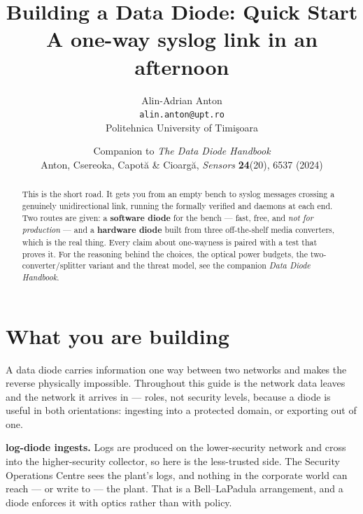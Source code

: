 \documentclass[11pt,a4paper]{article}
\title{\vspace{-12mm}\textbf{Building a Data Diode: Quick Start}\\[2mm]
       \large A one-way syslog link in an afternoon}
\author{Alin-Adrian Anton \\
        \small \texttt{alin.anton@upt.ro} \\
        \small Politehnica University of Timi\c{s}oara}
\date{\small Companion to \emph{The Data Diode Handbook}\\
      \small Anton, Csereoka, Capot\u{a} \& Cioarg\u{a},
      \emph{Sensors} \textbf{24}(20), 6537 (2024)}
\renewcommand{\amp}{\prog{ld\_amp}}
\renewcommand{\deamp}{\prog{ld\_deamp}}
\begin{document}
\maketitle
\thispagestyle{fancy}

\begin{abstract}
\noindent
This is the short road. It gets you from an empty bench to syslog messages
crossing a genuinely unidirectional link, running the formally verified
\amp{} and \deamp{} daemons at each end. Two routes are given: a
\textbf{software diode} for the bench --- fast, free, and \emph{not for
production} --- and a \textbf{hardware diode} built from three off-the-shelf
media converters, which is the real thing. Every claim about one-wayness is
paired with a test that proves it. For the reasoning behind the choices, the
optical power budgets, the two-converter/splitter variant and the threat
model, see the companion \emph{Data Diode Handbook}.
\end{abstract}

\vspace{2mm}
\tableofcontents
\vspace{4mm}

\section{What you are building}

A data diode carries information one way between two networks and makes the
reverse physically impossible. Throughout this guide \srcside{} is the network
data leaves and \dstside{} the network it arrives in --- roles, not security
levels, because a diode is useful in both orientations: ingesting into a
protected domain, or exporting out of one.

\textbf{log-diode ingests.} Logs are produced on the lower-security network
and cross into the higher-security collector, so here \srcside{} is the
less-trusted side. The Security Operations Centre sees the plant's logs, and
nothing in the corporate world can reach --- or write to --- the plant. That is
a Bell--LaPadula arrangement, and a diode enforces it with optics rather than
with policy.
\end{document}
